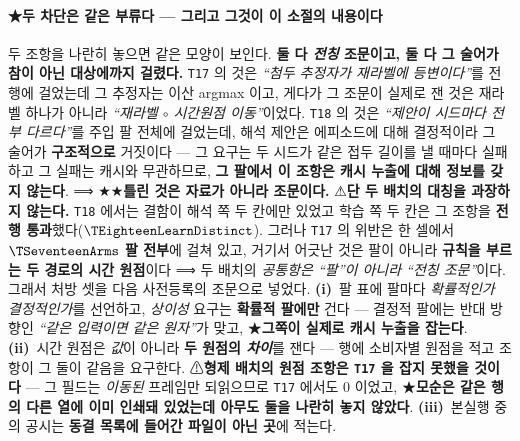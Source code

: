\documentclass[11pt]{report}
\numberwithin{equation}{chapter}
\numberwithin{figure}{chapter}
\numberwithin{table}{chapter}
\begin{document}
\paragraph{★두 차단은 같은 부류다 --- 그리고 그것이 이 소절의 내용이다}
두 조항을 나란히 놓으면 같은 모양이 보인다. \textbf{둘 다 \emph{전칭} 조문이고, 둘 다 그
술어가 참이 아닌 대상에까지 걸렸다.} \texttt{T17} 의 것은 \emph{``첨두 추정자가 재라벨에
등변이다''}를 전 행에 걸었는데 그 추정자는 이산 argmax 이고, 게다가 그 조문이 실제로 잰
것은 재라벨 하나가 아니라 \emph{``재라벨 $\circ$ 시간원점 이동''}이었다. \texttt{T18} 의
것은 \emph{``제안이 시드마다 전부 다르다''}를 주입 팔 전체에 걸었는데, 해석 제안은
에피소드에 대해 결정적이라 그 술어가 \textbf{구조적으로} 거짓이다
--- 그 요구는 두 시드가 같은 접두 길이를 낼 때마다 실패하고 그 실패는 캐시와 무관하므로,
\textbf{그 팔에서 이 조항은 캐시 누출에 대해 정보를 갖지 않는다}. ⟹ ★★\textbf{틀린 것은 자료가
아니라 조문이다.}
⚠\textbf{단 두 배치의 대칭을 과장하지 않는다.} \texttt{T18} 에서는 결함이 해석 쪽 두 칸에만
있었고 학습 쪽 두 칸은 그 조항을 \textbf{전 행 통과}했다($\TEighteenLearnDistinct$). 그러나
\texttt{T17} 의 위반은 한 셀에서 \textbf{$\TSeventeenArms$ 팔 전부}에 걸쳐 있고, 거기서
어긋난 것은 팔이 아니라 \textbf{규칙을 부르는 두 경로의 시간 원점}이다 ⟹ 두 배치의
\emph{공통항은 ``팔''이 아니라 ``전칭 조문''}이다.
그래서 처방 셋을 다음 사전등록의 조문으로 넣었다. \textbf{(i)}~팔 표에 팔마다
\emph{확률적인가 결정적인가}를 선언하고, \emph{상이성} 요구는 \textbf{확률적 팔에만} 건다 ---
결정적 팔에는 반대 방향인 \emph{``같은 입력이면 같은 원자''}가 맞고, ★\textbf{그쪽이 실제로
캐시 누출을 잡는다}. \textbf{(ii)}~시간 원점은 \emph{값}이 아니라 \textbf{두 원점의
\emph{차이}}를 잰다 --- 행에 소비자별 원점을 적고 조항이 그 둘이 같음을 요구한다.
⚠\textbf{형제 배치의 원점 조항은 \texttt{T17} 을 잡지 못했을 것이다} --- 그 필드는
\emph{이동된} 프레임만 되읽으므로 \texttt{T17} 에서도 $0$ 이었고, ★\textbf{모순은 같은 행의
다른 열에 이미 인쇄돼 있었는데 아무도 둘을 나란히 놓지 않았다}. \textbf{(iii)}~본실행 중의
공시는 \textbf{동결 목록에 들어간 파일이 아닌 곳}에 적는다.
\end{document}
